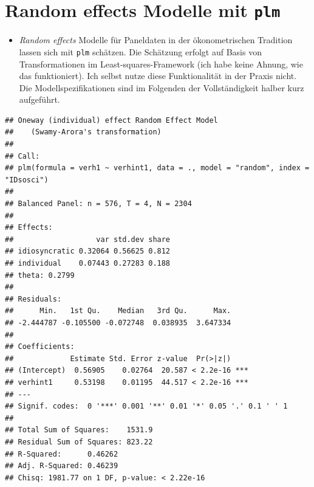 \documentclass[
]{book}
\newenvironment{Shaded}{\begin{snugshade}}{\end{snugshade}}
\newcommand{\CommentTok}[1]{\textcolor[rgb]{0.56,0.35,0.01}{\textit{#1}}}
\newcommand{\DataTypeTok}[1]{\textcolor[rgb]{0.13,0.29,0.53}{#1}}
\newcommand{\KeywordTok}[1]{\textcolor[rgb]{0.13,0.29,0.53}{\textbf{#1}}}
\newcommand{\NormalTok}[1]{#1}
\newcommand{\OperatorTok}[1]{\textcolor[rgb]{0.81,0.36,0.00}{\textbf{#1}}}
\newcommand{\StringTok}[1]{\textcolor[rgb]{0.31,0.60,0.02}{#1}}
\providecommand{\tightlist}{%
  \setlength{\itemsep}{0pt}\setlength{\parskip}{0pt}}
\begin{document}
\hypertarget{random-effects-modelle-mit-plm}{%
\section{\texorpdfstring{Random effects Modelle mit \texttt{plm}}{Random effects Modelle mit plm}}\label{random-effects-modelle-mit-plm}}

\begin{itemize}
\tightlist
\item
  \emph{Random effects} Modelle für Paneldaten in der ökonometrischen Tradition lassen sich mit \texttt{plm} schätzen. Die Schätzung erfolgt auf Basis von Transformationen im Least-squares-Framework (ich habe keine Ahnung, wie das funktioniert). Ich selbst nutze diese Funktionalität in der Praxis nicht. Die Modellspezifikationen sind im Folgenden der Vollständigkeit halber kurz aufgeführt.
\end{itemize}

\begin{Shaded}
\end{Shaded}

\begin{verbatim}
## Oneway (individual) effect Random Effect Model 
##    (Swamy-Arora's transformation)
## 
## Call:
## plm(formula = verh1 ~ verhint1, data = ., model = "random", index = "IDsosci")
## 
## Balanced Panel: n = 576, T = 4, N = 2304
## 
## Effects:
##                   var std.dev share
## idiosyncratic 0.32064 0.56625 0.812
## individual    0.07443 0.27283 0.188
## theta: 0.2799
## 
## Residuals:
##      Min.   1st Qu.    Median   3rd Qu.      Max. 
## -2.444787 -0.105500 -0.072748  0.038935  3.647334 
## 
## Coefficients:
##             Estimate Std. Error z-value  Pr(>|z|)    
## (Intercept)  0.56905    0.02764  20.587 < 2.2e-16 ***
## verhint1     0.53198    0.01195  44.517 < 2.2e-16 ***
## ---
## Signif. codes:  0 '***' 0.001 '**' 0.01 '*' 0.05 '.' 0.1 ' ' 1
## 
## Total Sum of Squares:    1531.9
## Residual Sum of Squares: 823.22
## R-Squared:      0.46262
## Adj. R-Squared: 0.46239
## Chisq: 1981.77 on 1 DF, p-value: < 2.22e-16
\end{verbatim}
\end{document}
